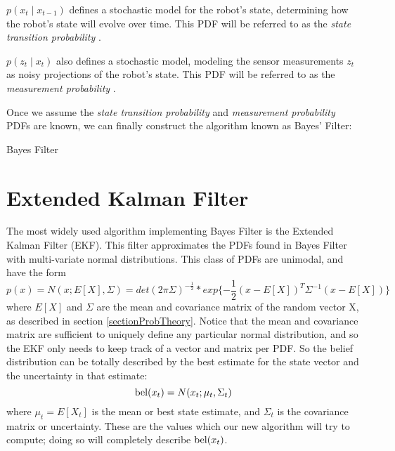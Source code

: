 \(p(x_t \mathbin{\vert} x_{t-1})\) defines a stochastic model for the robot's state, determining how the robot's state will evolve over time. This PDF will be referred to as the \textit{state transition probability}  \cite{probabilisticRobotics}.

\(p(z_t \mathbin{\vert} x_t)\) also defines a stochastic model, modeling the sensor measurements \(z_t\) as noisy projections of the robot's state. This PDF will be referred to as the \textit{measurement probability}  \cite{probabilisticRobotics}.

Once we assume the \textit{state transition probability} and \textit{measurement probability} PDFs are known, we can finally construct the algorithm known as Bayes' Filter:

\begin{algorithm} 
\caption{Bayes Filter} 
\label{alg:BayesFilter}
\begin{algorithmic}[1]
	\State {}
	\EndFunction
\end{algorithmic}
\end{algorithm}

\section{Extended Kalman Filter} \label{sectionEKF}

The most widely used algorithm implementing Bayes Filter is the Extended Kalman Filter (EKF). This filter approximates the PDFs found in Bayes Filter with multi-variate normal distributions. This class of PDFs are unimodal, and have the form 
\begin{equation} \label{eqDefNormal}
p(x) = N(x; E[X],\Sigma) = det(2 \pi \Sigma)^{-\frac{1}{2}} * exp \{-\frac{1}{2} (x - E[X])^T \Sigma^{-1} (x - E[X])\}
\end{equation}
where \(E[X]\) and \(\Sigma\) are the mean and covariance matrix of the random vector X, as described in section \ref{sectionProbTheory}. Notice that the mean and covariance matrix are sufficient to uniquely define any particular normal  distribution, and so the EKF only needs to keep track of a vector and matrix per PDF. So the belief distribution can be totally described by the best estimate for the state vector and the uncertainty in that estimate:
\begin{equation} \label{eqBelNormalDef}
\mathrm{bel}(x_t) = N(x_t; \mu_t,\Sigma_t)
\end{equation}
where \(\mu_t = E[X_t]\) is the mean or best state estimate, and \(\Sigma_t\) is the covariance matrix or uncertainty. These are the values which our new algorithm will try to compute; doing so will completely describe \(\mathrm{bel}(x_t)\).

